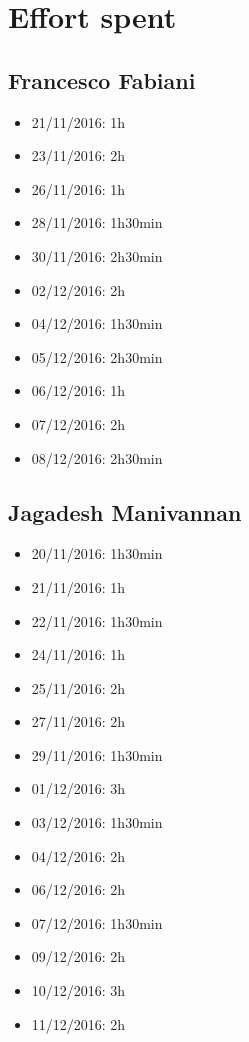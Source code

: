 \chapter{Effort spent}

\section{Francesco Fabiani}
\begin{itemize}
	\item 21/11/2016: 1h
	\item 23/11/2016: 2h
	\item 26/11/2016: 1h
	\item 28/11/2016: 1h30min
	\item 30/11/2016: 2h30min
	\item 02/12/2016: 2h
	\item 04/12/2016: 1h30min
	\item 05/12/2016: 2h30min
	\item 06/12/2016: 1h
	\item 07/12/2016: 2h
	\item 08/12/2016: 2h30min
\end{itemize}

\section{Jagadesh Manivannan}
\begin{itemize}
	\item 20/11/2016: 1h30min
	\item 21/11/2016: 1h
	\item 22/11/2016: 1h30min
	\item 24/11/2016: 1h
	\item 25/11/2016: 2h
	\item 27/11/2016: 2h
	\item 29/11/2016: 1h30min
	\item 01/12/2016: 3h
	\item 03/12/2016: 1h30min
	\item 04/12/2016: 2h
	\item 06/12/2016: 2h
	\item 07/12/2016: 1h30min
	\item 09/12/2016: 2h
	\item 10/12/2016: 3h
	\item 11/12/2016: 2h
\end{itemize}

